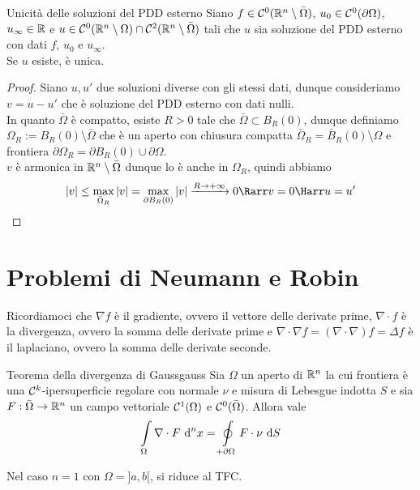 \documentclass{book}
\begin{document}
\begin{theorem}{Unicità delle soluzioni del PDD esterno}{}
    Siano $f\in\mathcal{C}^0(\mathbb{R}^n\setminus\bar{\Omega})$, $u_0\in \mathcal{C}^0(\partial\Omega)$, $u_\infty \in \mathbb{R}$ e $u\in\mathcal{C}^0(\mathbb{R}^n\setminus\Omega)\cap\mathcal{C}^2(\mathbb{R}^n\setminus\bar{\Omega})$ tali che $u$ sia soluzione del PDD esterno con dati $f$, $u_0$ e $u_\infty$.\\
    Se $u$ esiste, è unica.
\end{theorem}
\begin{proof}
    Siano $u,u'$ due soluzioni diverse con gli stessi dati, dunque consideriamo $v = u-u'$ che è soluzione del PDD esterno con dati nulli.\\
    In quanto $\bar{\Omega}$ è compatto, esiste $R>0$ tale che $\bar{\Omega}\subset B_R(0)$, dunque definiamo $\Omega_R := B_R(0) \setminus \bar{\Omega}$ che è un aperto con chiusura compatta $\bar{\Omega}_R = \bar{B}_R(0)\setminus\Omega$ e frontiera $\partial\Omega_R = \partial B_R(0) \cup \partial\Omega$.\\
    $v$ è armonica in $\mathbb{R}^n\setminus \bar{\Omega}$ dunque lo è anche in $\Omega_R$, quindi abbiamo
    \[|v|\le \max_{\bar{\Omega}_R}|v| = \max_{\partial B_R(0)} |v| \xrightarrow{R\to +\infty} 0  \Rarr v = 0 \Harr u=u'\]
\end{proof}

\section{Problemi di Neumann e Robin}

\begin{notation}
    Ricordiamoci che $\nabla f$ è il gradiente, ovvero il vettore delle derivate prime, $\nabla \cdot f$ è la divergenza, ovvero la somma delle derivate prime e $\nabla\cdot\nabla f = (\nabla \cdot\nabla) f = \Delta f$ è il laplaciano, ovvero la somma delle derivate seconde.
\end{notation}

\begin{theorem}{Teorema della divergenza di Gauss}{gauss}
    Sia $\Omega$ un aperto di $\mathbb{R}^n$ la cui frontiera è una $\mathcal{C}^k$-ipersuperficie regolare con normale $\nu$ e misura di Lebesgue indotta $S$ e sia $F:\bar{\Omega}\to\mathbb{R}^n$ un campo vettoriale $\mathcal{C}^1(\Omega)$ e $\mathcal{C}^0(\bar{\Omega})$. Allora vale
    \[\int\limits_\Omega \nabla \cdot F \text{ d}^n x = \oint\limits_{+\partial\Omega} F \cdot\nu \text{ d} S\]
\end{theorem}

\begin{remark}{}{}
    Nel caso $n=1$ con $\Omega =]a,b[$, si riduce al TFC.
\end{remark}
\end{document}
